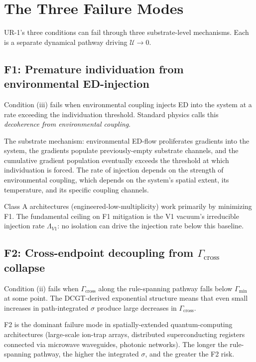 \documentclass[11pt,a4paper]{article}
\begin{document}
\section{The Three Failure Modes}

UR-1's three conditions can fail through three substrate-level mechanisms. Each is a separate dynamical pathway driving $\mathcal{U} \to 0$.

\subsection{F1: Premature individuation from environmental ED-injection}

Condition (iii) fails when environmental coupling injects ED into the system at a rate exceeding the individuation threshold. Standard physics calls this \emph{decoherence from environmental coupling}.

The substrate mechanism: environmental ED-flow proliferates gradients into the system, the gradients populate previously-empty substrate channels, and the cumulative gradient population eventually exceeds the threshold at which individuation is forced. The rate of injection depends on the strength of environmental coupling, which depends on the system's spatial extent, its temperature, and its specific coupling channels.

Class A architectures (engineered-low-multiplicity) work primarily by minimizing F1. The fundamental ceiling on F1 mitigation is the V1 vacuum's irreducible injection rate $\Lambda_{V1}$: no isolation can drive the injection rate below this baseline.

\subsection{F2: Cross-endpoint decoupling from $\Gamma_{\mathrm{cross}}$ collapse}

Condition (ii) fails when $\Gamma_{\mathrm{cross}}$ along the rule-spanning pathway falls below $\Gamma_{\min}$ at some point. The DCGT-derived exponential structure means that even small increases in path-integrated $\sigma$ produce large decreases in $\Gamma_{\mathrm{cross}}$.

F2 is the dominant failure mode in spatially-extended quantum-computing architectures (large-scale ion-trap arrays, distributed superconducting registers connected via microwave waveguides, photonic networks). The longer the rule-spanning pathway, the higher the integrated $\sigma$, and the greater the F2 risk.
\end{document}
